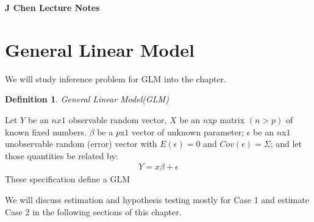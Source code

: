 \documentclass[12pt]{article}
\newtheorem{definition}{Definition}
\numberwithin{equation}{section}
\begin{document}
\centerline{\bf J Chen Lecture Notes} 
\section{General Linear Model}
We will study inference problem for GLM into the chapter.
\begin{definition}{General Linear Model(GLM)}

\end{definition}
Let $Y$ be an $nx1$ observable random vector, $X$ be an $n$x$p$ matrix $(n>p)$ of known fixed numbers. $\beta$ be a $p$x$1$ vector of unknown parameter; $\epsilon$ be an $n$x$1$ unobservable random (error) vector with $E(\epsilon)=0$ and $Cov(\epsilon) = \Sigma$; and let those quantities be related by:
\begin{eqnarray}
Y = x\beta + \epsilon
\end{eqnarray}
These specification define a GLM

We will discuss estimation and hypothesis testing mostly for Case 1 and estimate Case 2 in the following sections of this chapter.
\end{document}
